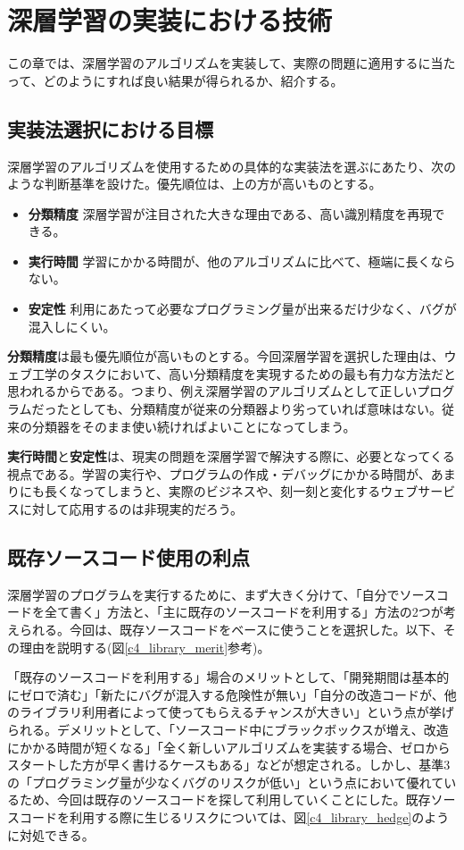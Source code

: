 \chapter{深層学習の実装における技術}
この章では、深層学習のアルゴリズムを実装して、実際の問題に適用するに当たって、どのようにすれば良い結果が得られるか、紹介する。
\section{実装法選択における目標}
深層学習のアルゴリズムを使用するための具体的な実装法を選ぶにあたり、次のような判断基準を設けた。優先順位は、上の方が高いものとする。
\begin{itemize}
\item \textbf{分類精度} 深層学習が注目された大きな理由である、高い識別精度を再現できる。
\item \textbf{実行時間} 学習にかかる時間が、他のアルゴリズムに比べて、極端に長くならない。
\item \textbf{安定性} 利用にあたって必要なプログラミング量が出来るだけ少なく、バグが混入しにくい。
\end{itemize}
\textbf{分類精度}は最も優先順位が高いものとする。今回深層学習を選択した理由は、ウェブ工学のタスクにおいて、高い分類精度を実現するための最も有力な方法だと思われるからである。つまり、例え深層学習のアルゴリズムとして正しいプログラムだったとしても、分類精度が従来の分類器より劣っていれば意味はない。従来の分類器をそのまま使い続ければよいことになってしまう。\par
\textbf{実行時間}と\textbf{安定性}は、現実の問題を深層学習で解決する際に、必要となってくる視点である。学習の実行や、プログラムの作成・デバッグにかかる時間が、あまりにも長くなってしまうと、実際のビジネスや、刻一刻と変化するウェブサービスに対して応用するのは非現実的だろう。

\section{既存ソースコード使用の利点}
深層学習のプログラムを実行するために、まず大きく分けて、「自分でソースコードを全て書く」方法と、「主に既存のソースコードを利用する」方法の2つが考えられる。今回は、既存ソースコードをベースに使うことを選択した。以下、その理由を説明する(図\ref{c4_library_merit}参考)。\par
「既存のソースコードを利用する」場合のメリットとして、「開発期間は基本的にゼロで済む」「新たにバグが混入する危険性が無い」「自分の改造コードが、他のライブラリ利用者によって使ってもらえるチャンスが大きい」という点が挙げられる。デメリットとして、「ソースコード中にブラックボックスが増え、改造にかかる時間が短くなる」「全く新しいアルゴリズムを実装する場合、ゼロからスタートした方が早く書けるケースもある」などが想定される。しかし、基準3の「プログラミング量が少なくバグのリスクが低い」という点において優れているため、今回は既存のソースコードを探して利用していくことにした。既存ソースコードを利用する際に生じるリスクについては、図\ref{c4_library_hedge}のように対処できる。\par

